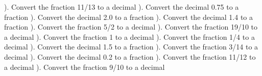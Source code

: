 \documentclass{article}%
\begin{document}
\newline%
\newline%
). Convert the fraction 11/13 to a decimal%
\newline%
\newline%
). Convert the decimal 0.75 to a fraction%
\newline%
\newline%
). Convert the decimal 2.0 to a fraction%
\newline%
\newline%
). Convert the decimal 1.4 to a fraction%
\newline%
\newline%
). Convert the fraction 5/2 to a decimal%
\newline%
\newline%
). Convert the fraction 19/10 to a decimal%
\newline%
\newline%
). Convert the fraction 1 to a decimal%
\newline%
\newline%
). Convert the fraction 1/4 to a decimal%
\newline%
\newline%
). Convert the decimal 1.5 to a fraction%
\newline%
\newline%
). Convert the fraction 3/14 to a decimal%
\newline%
\newline%
). Convert the decimal 0.2 to a fraction%
\newline%
\newline%
). Convert the fraction 11/12 to a decimal%
\newline%
\newline%
). Convert the fraction 9/10 to a decimal%
\newline%
\newline%
\end{document}
